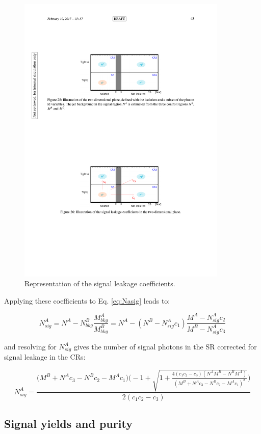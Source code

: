 \documentclass[11pt,a4paper,twoside,openright]{book}
\begin{document}
\begin{figure}
    \centering
    \includegraphics[width=10cm]{Signal_Leakage.pdf}
    \caption{Representation of the signal leakage coefficients.}
    \label{fig:Signal_Leakage}
\end{figure}

Applying these coefficients to Eq. \ref{eq:Nasig} leads to:

\begin{equation}
    N^{A}_{sig} = N^{A} - N^{B}_{bkg} \frac{M^{A}_{bkg}}{M^{B}_{bkg}} = N^{A} - (N^{B} - N^{A}_{sig} c_{1}) \frac{M^{A} - N^{A}_{sig} c_{2}}{M^{B} - N^{A}_{sig} c_{3}}
\end{equation}

and resolving for $N^{A}_{sig}$ gives the number of signal photons in the SR corrected for signal leakage in the CRs:

\begin{equation}
    N^{A}_{sig} = \frac{\bigl(M^{B} + N^{A}c_{3} - N^{B}c_{2} - M^{A}c_{1}\bigr)\bigl(-1 + \sqrt{1 + \frac{4(c_{1}c_{2} - c_{3})(N^{A}M^{B} - N^{B}M^{A})}{(M^{B} + N^{A}c_{3} - N^{B}c_{2} - M^{A}c_{1})^{2}}}\bigr)}{2(c_{1}c_{2} - c_{3})}
\end{equation}


\subsection{Signal yields and purity} \label{Purity}
\end{document}
